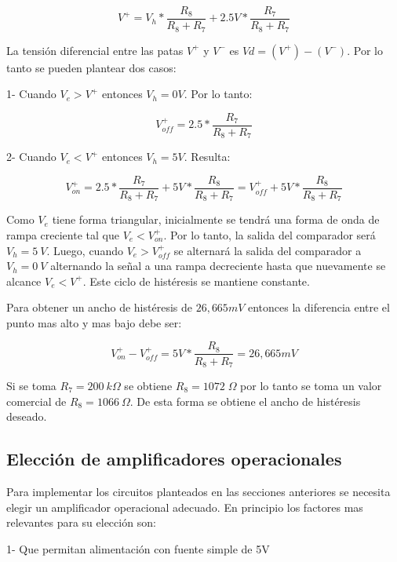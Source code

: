 \begin{equation} 
	V^+ = V_h*\frac{R_{8}}{R_{8}+R_{7}} + 2.5V*\frac{R_{7}}{R_{8}+R_{7}}
\end{equation} 

La tensión diferencial entre las patas $V^+$ y $V^-$ es $Vd=(V^+)-(V^-)$. Por lo tanto se pueden plantear dos casos: 

1- Cuando $V_e>V^+$ entonces $V_h=0V$. Por lo tanto:

\begin{equation}
	V^+_{off}=2.5*\frac{R_{7}}{R_{8}+R_{7}}
\end{equation}

2- Cuando $V_e<V^+$ entonces $V_h=5V$. Resulta:

\begin{equation}
	V^+_{on}=2.5*\frac{R_{7}}{R_{8}+R_{7}} + 5V*\frac{R_{8}}{R_{8}+R_{7}}=V^+_{off}+5V*\frac{R_{8}}{R_{8}+R_{7}}
\end{equation}

Como $V_{e}$ tiene forma triangular, inicialmente se tendrá una forma de onda de rampa creciente tal que $V_e < V^+_{on}$. Por lo tanto, la salida del comparador será $V_{h}=5\:V$. Luego, cuando $V_e > V^+_{off}$ se alternará la salida del comparador a $V_{h}=0\:V$ alternando la señal a una rampa decreciente hasta que nuevamente se alcance $V_e<V^+$. Este ciclo de histéresis se mantiene constante.

Para obtener un ancho de histéresis de $26,665 mV$ entonces la diferencia entre el punto mas alto y mas bajo debe ser:

\begin{equation}
	V^+_{on}-V^+_{off} = 5V*\frac{R_{8}}{R_{8}+R_{7}}= 26,665 mV
\end{equation}

Si se toma $R_{7}=200 \:k\Omega$ se obtiene $R_{8}=1072 \;\Omega$ por lo tanto se toma un valor comercial de $R_{8}=1066\:\Omega$. De esta forma se obtiene el ancho de histéresis deseado.

\subsection{Elección de amplificadores operacionales}

Para implementar los circuitos planteados en las secciones anteriores se necesita elegir un amplificador operacional adecuado. En principio los factores mas relevantes para su elección son:

1- Que permitan alimentación con fuente simple de 5V

